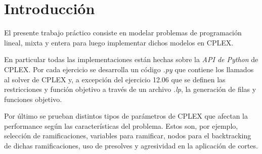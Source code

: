 \section{Introducción}

\quad    El presente trabajo práctico consiste en modelar problemas de programación lineal, mixta y entera para luego implementar dichos modelos en CPLEX.

\quad    En particular todas las implementaciones están hechas sobre la \emph{API de Python} de CPLEX. Por cada ejercicio se desarrolla un código \emph{.py} que contiene los llamados al solver de CPLEX y, a excepción del ejercicio 12.06 que se definen las restricciones y función objetivo a través de un archivo \emph{.lp}, la generación de filas y funciones objetivo.

\quad    Por último se prueban distintos tipos de parámetros de CPLEX que afectan la performance según las características del problema. Estos son, por ejemplo, selección de ramificaciones, variables para ramificar, nodos para el backtracking de dichas ramificaciones, uso de presolves y agresividad en la aplicación de cortes.
